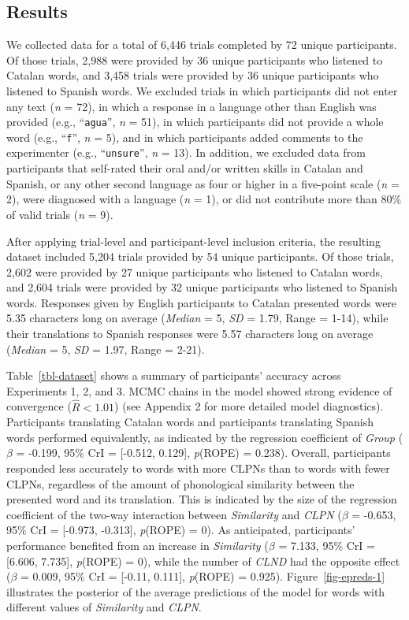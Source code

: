 \documentclass[
]{article}
\begin{document}
\subsection{Results}\label{results}

We collected data for a total of 6,446 trials completed by 72 unique
participants. Of those trials, 2,988 were provided by 36 unique
participants who listened to Catalan words, and 3,458 trials were
provided by 36 unique participants who listened to Spanish words. We
excluded trials in which participants did not enter any text (\emph{n} =
72), in which a response in a language other than English was provided
(e.g., ``\texttt{agua}'', \emph{n} = 51), in which participants did not
provide a whole word (e.g., ``\texttt{f}'', \emph{n} = 5), and in which
participants added comments to the experimenter (e.g.,
``\texttt{unsure}'', \emph{n} = 13). In addition, we excluded data from
participants that self-rated their oral and/or written skills in Catalan
and Spanish, or any other second language as four or higher in a
five-point scale (\emph{n} = 2), were diagnosed with a language
(\emph{n} = 1), or did not contribute more than 80\% of valid trials
(\emph{n} = 9).

After applying trial-level and participant-level inclusion criteria, the
resulting dataset included 5,204 trials provided by 54 unique
participants. Of those trials, 2,602 were provided by 27 unique
participants who listened to Catalan words, and 2,604 trials were
provided by 32 unique participants who listened to Spanish words.
Responses given by English participants to Catalan presented words were
5.35 characters long on average (\emph{Median} = 5, \emph{SD} = 1.79,
Range = 1-14), while their translations to Spanish responses were 5.57
characters long on average (\emph{Median} = 5, \emph{SD} = 1.97, Range =
2-21).

Table~\ref{tbl-dataset} shows a summary of participants' accuracy across
Experiments 1, 2, and 3. MCMC chains in the model showed strong evidence
of convergence (\(\hat{R}<1.01\)) (see Appendix 2 for more detailed
model diagnostics). Participants translating Catalan words and
participants translating Spanish words performed equivalently, as
indicated by the regression coefficient of \emph{Group} (\(\beta\) =
-0.199, 95\% CrI = {[}-0.512, 0.129{]}, \emph{p}(ROPE) = 0.238).
Overall, participants responded less accurately to words with more CLPNs
than to words with fewer CLPNs, regardless of the amount of phonological
similarity between the presented word and its translation. This is
indicated by the size of the regression coefficient of the two-way
interaction between \emph{Similarity} and \emph{CLPN} (\(\beta\) =
-0.653, 95\% CrI = {[}-0.973, -0.313{]}, \emph{p}(ROPE) = 0). As
anticipated, participants' performance benefited from an increase in
\emph{Similarity} (\(\beta\) = 7.133, 95\% CrI = {[}6.606, 7.735{]},
\emph{p}(ROPE) = 0), while the number of \emph{CLND} had the opposite
effect (\(\beta\) = 0.009, 95\% CrI = {[}-0.11, 0.111{]}, \emph{p}(ROPE)
= 0.925). Figure~\ref{fig-epreds-1} illustrates the posterior of the
average predictions of the model for words with different values of
\emph{Similarity} and \emph{CLPN}.
\end{document}
